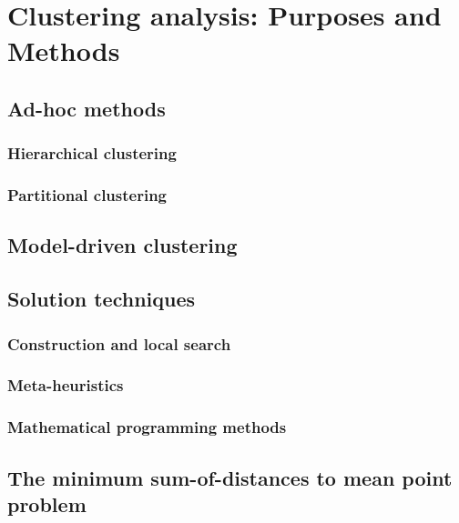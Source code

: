 \chapter{Clustering analysis: Purposes and Methods}

\section{Ad-hoc methods}

\subsection{Hierarchical clustering}

\subsection{Partitional clustering}

\section{Model-driven clustering}

\section{Solution techniques}

\subsection{Construction and local search}

\subsection{Meta-heuristics}

\subsection{Mathematical programming methods}

\section{The minimum sum-of-distances to mean point problem}